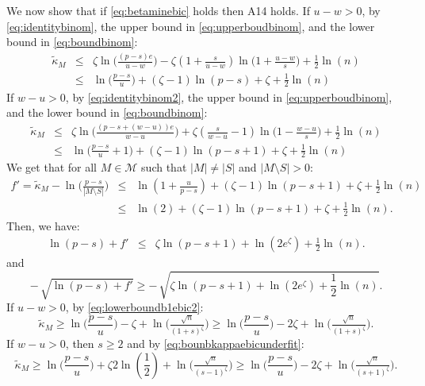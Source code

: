 \documentclass[aos]{imsart}
\theoremstyle{plain}
\begin{document}
We now show that if \eqref{eq:betaminebic} holds then A14 holds. If $u-w>0$, by \eqref{eq:identitybinom}, the upper bound in \eqref{eq:upperboudbinom}, and the lower bound in \eqref{eq:boundbinom}:
 \begin{eqnarray*}
     \tilde{\kappa}_M &\leq& \zeta\ln\Big(\frac{(p-s)e}{u-w}\Big)-\zeta(1+\frac{s}{u-w})\ln\Big(1+\frac{u-w}{s}\Big)+\frac{1}{2}\ln(n)\\
     &\leq& \ln\big(\frac{p-s}{u}\big)+(\zeta-1)\ln(p-s)+\zeta+\frac{1}{2}\ln(n)
 \end{eqnarray*}
If $w-u>0$, by \eqref{eq:identitybinom2}, the upper bound in \eqref{eq:upperboudbinom}, and the lower bound in \eqref{eq:boundbinom}:
 \begin{eqnarray*}
     \tilde{\kappa}_M &\leq& 
     \zeta\ln\Big(\frac{(p-s+(w-u))e}{w-u}\Big)+\zeta(\frac{s}{w-u}-1)\ln\Big(1
     -\frac{w-u}{s}\Big)+\frac{1}{2}\ln(n)\\
     &\leq&\ln\big(\frac{p-s}{u}+1\big)+(\zeta-1)\ln(p-s+1)+\zeta+\frac{1}{2}\ln(n)
 \end{eqnarray*}
 We get that for all $M\in \mathcal{M}$ such that $|M|\neq |S|$ and $|M\setminus S|>0$:
 \begin{eqnarray*}
    f'= \tilde{\kappa}_{M} - \ln\Big(\frac{p-s}{|M\setminus S|}\Big) 
    &\leq& \ln(1+\frac{u}{p-s})+(\zeta-1)\ln(p-s+1)+\zeta+\frac{1}{2}\ln(n)\\
    &\leq& \ln(2)+(\zeta-1)\ln(p-s+1)+\zeta+\frac{1}{2}\ln(n).
 \end{eqnarray*}
Then, we have:
 \begin{eqnarray*}
    \ln(p-s)+ f'
    &\leq& \zeta\ln(p-s+1)+\ln(2e^{\zeta})+\frac{1}{2}\ln(n).
 \end{eqnarray*}
 and
\begin{equation}\label{eq:xxxxx}
     - \,\sqrt{\ln(p-s) + f'} \geq - \,\sqrt{\zeta\ln(p-s+1)+\ln(2e^{\zeta})+\frac{1}{2}\ln(n)} .
\end{equation}
If $u-w>0$, by \eqref{eq:lowerboundb1ebic2}:
\begin{equation*}
        \tilde{\kappa}_{M} \geq \ln\big(\frac{p-s}{u}\big)-\zeta+ \ln \big(\tfrac{\sqrt{n}}{(1+s)^{\zeta}}\big) \geq \ln\big(\frac{p-s}{u}\big)-2\zeta+ \ln \big(\tfrac{\sqrt{n}}{(1+s)^{\zeta}}\big).
\end{equation*}
If $w-u>0$, then $s\geq 2$ and by \eqref{eq:bounbkappaebicunderfit}:
$$\tilde{\kappa}_{M} \geq \ln\big(\frac{p-s}{u}\big)+\zeta 2\ln(\frac{1}{2})+ \ln \big(\tfrac{\sqrt{n}}{(s-1)^{\zeta}}\big) \geq \ln\big(\frac{p-s}{u}\big)-2\zeta + \ln \big(\tfrac{\sqrt{n}}{(s+1)^{\zeta}}\big).$$
\end{document}
